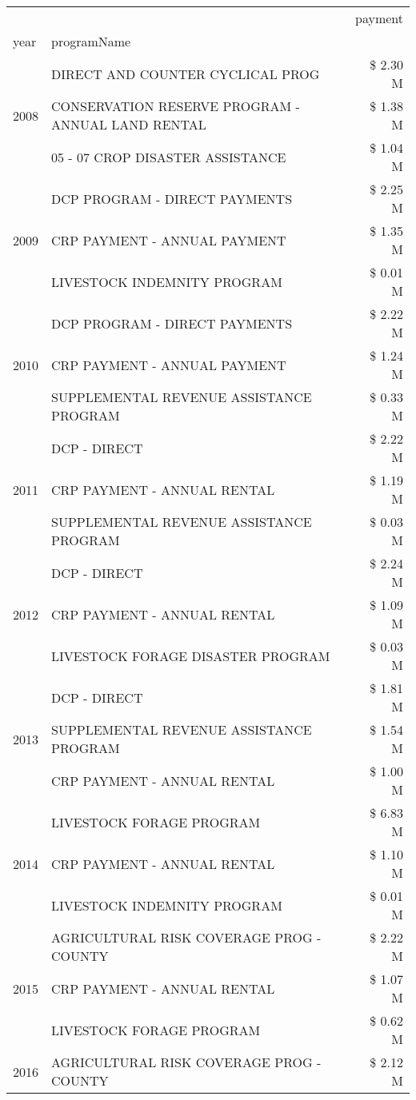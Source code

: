 \begin{tabular}{llr}
\toprule
 &  & payment \\
year & programName &  \\
\midrule
\multirow[t]{3}{*}{2008} & DIRECT AND COUNTER CYCLICAL PROG & \$ 2.30 M \\
 & CONSERVATION RESERVE PROGRAM - ANNUAL LAND RENTAL & \$ 1.38 M \\
 & 05 - 07 CROP DISASTER ASSISTANCE & \$ 1.04 M \\
\cline{1-3}
\multirow[t]{3}{*}{2009} & DCP PROGRAM - DIRECT PAYMENTS & \$ 2.25 M \\
 & CRP PAYMENT - ANNUAL PAYMENT & \$ 1.35 M \\
 & LIVESTOCK INDEMNITY PROGRAM & \$ 0.01 M \\
\cline{1-3}
\multirow[t]{3}{*}{2010} & DCP PROGRAM - DIRECT PAYMENTS & \$ 2.22 M \\
 & CRP PAYMENT - ANNUAL PAYMENT & \$ 1.24 M \\
 & SUPPLEMENTAL REVENUE ASSISTANCE PROGRAM & \$ 0.33 M \\
\cline{1-3}
\multirow[t]{3}{*}{2011} & DCP - DIRECT & \$ 2.22 M \\
 & CRP PAYMENT - ANNUAL RENTAL & \$ 1.19 M \\
 & SUPPLEMENTAL REVENUE ASSISTANCE PROGRAM & \$ 0.03 M \\
\cline{1-3}
\multirow[t]{3}{*}{2012} & DCP - DIRECT & \$ 2.24 M \\
 & CRP PAYMENT - ANNUAL RENTAL & \$ 1.09 M \\
 & LIVESTOCK FORAGE DISASTER PROGRAM & \$ 0.03 M \\
\cline{1-3}
\multirow[t]{3}{*}{2013} & DCP - DIRECT & \$ 1.81 M \\
 & SUPPLEMENTAL REVENUE ASSISTANCE PROGRAM & \$ 1.54 M \\
 & CRP PAYMENT - ANNUAL RENTAL & \$ 1.00 M \\
\cline{1-3}
\multirow[t]{3}{*}{2014} & LIVESTOCK FORAGE PROGRAM & \$ 6.83 M \\
 & CRP PAYMENT - ANNUAL RENTAL & \$ 1.10 M \\
 & LIVESTOCK INDEMNITY PROGRAM & \$ 0.01 M \\
\cline{1-3}
\multirow[t]{3}{*}{2015} & AGRICULTURAL RISK COVERAGE PROG - COUNTY & \$ 2.22 M \\
 & CRP PAYMENT - ANNUAL RENTAL & \$ 1.07 M \\
 & LIVESTOCK FORAGE PROGRAM & \$ 0.62 M \\
\cline{1-3}
\multirow[t]{3}{*}{2016} & AGRICULTURAL RISK COVERAGE PROG - COUNTY & \$ 2.12 M \\

\end{tabular}
